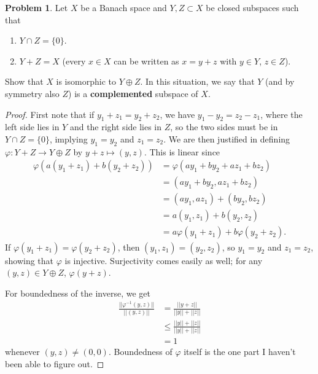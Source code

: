 \documentclass[12pt]{article}
\theoremstyle{definition}
\newtheorem{ex}{Problem}
\begin{document}
\begin{ex}
  Let $X$ be a Banach space and $Y, Z \subset X$ be closed subspaces such that \begin{enumerate}[label=(\arabic*)]
    \item $Y \cap Z = \lbrace 0 \rbrace$.
    \item $Y + Z = X$ (every $x \in X$ can be written as $x = y + z$ with $y \in Y$, $z \in Z$).
  \end{enumerate}
  Show that $X$ is isomorphic to $Y \oplus Z$.
  In this situation, we say that $Y$ (and by symmetry also $Z$) is a \textbf{complemented} subspace of $X$.
\end{ex}
\begin{proof}
    First note that if $y_1 + z_1 = y_2 + z_2$, we have $y_1 - y_2 = z_2 - z_1$, where the left side lies in $Y$ and the right side lies in $Z$, so the two sides must be in $Y \cap Z = \lbrace 0 \rbrace$, implying $y_1 = y_2$ and $z_1 = z_2$.
    We are then justified in defining $\varphi: Y + Z \to Y \oplus Z$ by $y + z \mapsto (y, z)$.
    This is linear since \begin{align*}
        \varphi(a(y_1 + z_1) + b(y_2 + z_2)) & = \varphi(ay_1 + by_2 + az_1 + bz_2) \\
                                       & = (ay_1+ by_2, az_1 + bz_2) \\
                                       & = (ay_1, az_1) + (by_2, bz_2) \\
                                       & = a(y_1, z_1) + b(y_2, z_2) \\
                                       & = a\varphi(y_1 + z_1) + b\varphi(y_2 + z_2).
    \end{align*}
    If $\varphi(y_1 + z_1) = \varphi(y_2 + z_2)$, then $(y_1, z_1) = (y_2, z_2)$, so $y_1 = y_2$ and $z_1 = z_2$, showing that $\varphi$ is injective.
    Surjectivity comes easily as well; for any $(y, z) \in Y \oplus Z$, $\varphi(y + z)$.

    For boundedness of the inverse, we get \begin{align*}
        \frac{||\varphi^{-1}(y, z)||}{||(y,z)||} & = \frac{||y + z||}{||y|| + ||z||} \\
                                                 & \leq \frac{||y|| + ||z||}{||y|| + ||z||} \\
                                                 & = 1
    \end{align*}
    whenever $(y, z) \neq (0, 0)$.
    Boundedness of $\varphi$ itself is the one part I haven't been able to figure out.
\end{proof}
\end{document}
